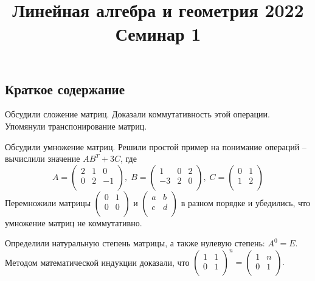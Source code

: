 \documentclass[12pt, a4paper]{extarticle}
\title{{\normalsize Линейная алгебра и геометрия 2022} \\ \vspace{0.5em}  Семинар 1}
\author{ \rule{15cm}{0.4pt}}
\date{}
\theoremstyle{definition}
\begin{document}
	\maketitle
	\subsection*{Краткое содержание}
    Обсудили сложение матриц. Доказали коммутативность этой операции. Упомянули транспонирование матриц.
    
    Обсудили умножение матриц. Решили простой пример на понимание операций -- вычислили значение $AB^T + 3C$, где
    \[
    A = \begin{pmatrix}
        2 & 1 & 0 \\
        0 & 2 & -1 \\
    \end{pmatrix}, \;
    B = \begin{pmatrix}
        1 & 0 & 2 \\
        -3 & 2 & 0 \\
    \end{pmatrix}, \;
    C = \begin{pmatrix}
        0 & 1 \\
        1 & 2 \\
    \end{pmatrix}
    \]
    Перемножили матрицы 
    $\begin{pmatrix}
        0 & 1 \\
        0 & 0 \\
    \end{pmatrix}$ 
    и
    $\begin{pmatrix}
        a & b \\
        c & d \\
    \end{pmatrix}$
    в разном порядке и убедились, что умножение матриц не коммутативно.

    Определили натуральную степень матрицы, а также нулевую степень: $A^0 = E$. Методом математической индукции доказали, что 
    $\begin{pmatrix}
        1 & 1 \\
        0 & 1 \\
    \end{pmatrix}^n = 
    \begin{pmatrix}
        1 & n \\
        0 & 1 \\
    \end{pmatrix}.$
    
\end{document}
